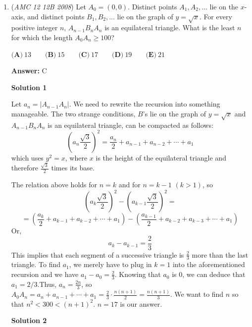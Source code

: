 \begin{enumerate}
 \textbf{Alternative thinking} After arriving at the equation $n(n+1)^2 = 1584$, notice that all of the answer choices are in the form $10+k$, where $k$ is $1-5$. We notice that the ones digit of $n(n+1)^2$ is $4$, and it is dependent on the ones digit of the answer choices. Trying $1-5$ for $n$, we see that only $1$ yields a ones digit of $4$, so our answer is $11$.

 


	\item (\textit{AMC 12 12B 2008}) Let $A_0 = (0,0)$. Distinct points $A_1,A_2,\ldots$ lie on the $x$-axis, and distinct points $B_1,B_2,\ldots$ lie on the graph of $y = \sqrt {x}$. For every positive integer $n$, $A_{n - 1}B_nA_n$ is an equilateral triangle. What is the least $n$ for which the length $A_0A_n\ge100$?


 $\textbf{(A)}\ 13\qquad \textbf{(B)}\ 15\qquad \textbf{(C)}\ 17\qquad \textbf{(D)}\ 19\qquad \textbf{(E)}\ 21$

 \textbf{Answer: }C



\textbf{Solution 1}

Let $a_n=|A_{n-1}A_n|$. We need to rewrite the recursion into something manageable. The two strange conditions, $B$'s lie on the graph of $y=\sqrt{x}$ and $A_{n-1}B_nA_n$ is an equilateral triangle, can be compacted as follows: 
 \[\left(a_n\frac{\sqrt{3}}{2}\right)^2=\frac{a_n}{2}+a_{n-1}+a_{n-2}+\cdots+a_1\]which uses $y^2=x$, where $x$ is the height of the equilateral triangle and therefore $\frac{\sqrt{3}}{2}$ times its base.

 The relation above holds for $n=k$ and for $n=k-1$ $(k>1)$, so 
 \[\left(a_k\frac{\sqrt{3}}{2}\right)^2-\left(a_{k-1}\frac{\sqrt{3}}{2}\right)^2=\]
 \[=\left(\frac{a_k}{2}+a_{k-1}+a_{k-2}+\cdots+a_1\right)-\left(\frac{a_{k-1}}{2}+a_{k-2}+a_{k-3}+\cdots+a_1\right)\]Or, 
 \[a_k-a_{k-1}=\frac23\] This implies that each segment of a successive triangle is $\frac23$ more than the last triangle. To find $a_{1}$, we merely have to plug in $k=1$ into the aforementioned recursion and we have $a_{1} - a_{0} = \frac23$. Knowing that $a_{0}$ is $0$, we can deduce that $a_{1} = 2/3$.Thus, $a_n=\frac{2n}{3}$, so $A_0A_n=a_n+a_{n-1}+\cdots+a_1=\frac{2}{3} \cdot \frac{n(n+1)}{2} = \frac{n(n+1)}{3}$. We want to find $n$ so that $n^2<300<(n+1)^2$. $n=\boxed{17}$ is our answer.

 



\textbf{Solution 2}


\end{enumerate}
